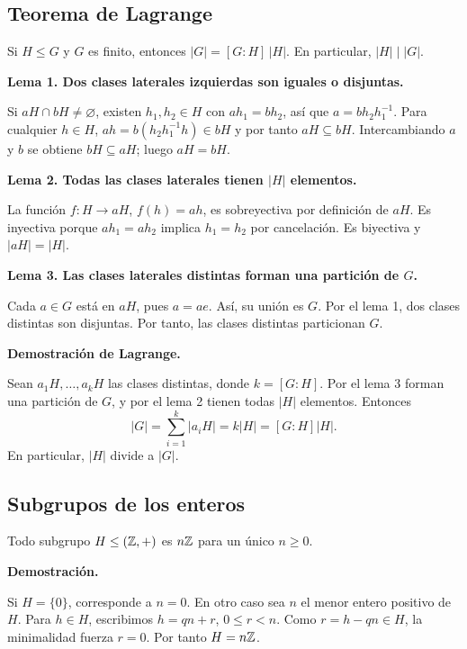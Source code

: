 \documentclass[11pt,a4paper]{article}
\begin{document}
\subsection{Teorema de Lagrange}
\begin{resultado}
Si $H\le G$ y $G$ es finito, entonces $|G|=[G:H]\,|H|$. En particular, $|H|\mid |G|$.
\end{resultado}
\textbf{Lema 1. Dos clases laterales izquierdas son iguales o disjuntas.}
\begin{demostracion}
Si $aH\cap bH\ne\varnothing$, existen $h_1,h_2\in H$ con $ah_1=bh_2$, así que $a=bh_2h_1^{-1}$. Para cualquier $h\in H$, $ah=b(h_2h_1^{-1}h)\in bH$ y por tanto $aH\subseteq bH$. Intercambiando $a$ y $b$ se obtiene $bH\subseteq aH$; luego $aH=bH$.
\end{demostracion}
\textbf{Lema 2. Todas las clases laterales tienen $|H|$ elementos.}
\begin{demostracion}
La función $f:H\to aH$, $f(h)=ah$, es sobreyectiva por definición de $aH$. Es inyectiva porque $ah_1=ah_2$ implica $h_1=h_2$ por cancelación. Es biyectiva y $|aH|=|H|$.
\end{demostracion}
\textbf{Lema 3. Las clases laterales distintas forman una partición de $G$.}
\begin{demostracion}
Cada $a\in G$ está en $aH$, pues $a=ae$. Así, su unión es $G$. Por el lema 1, dos clases distintas son disjuntas. Por tanto, las clases distintas particionan $G$.
\end{demostracion}
\textbf{Demostración de Lagrange.}
\begin{demostracion}
Sean $a_1H,\dots,a_kH$ las clases distintas, donde $k=[G:H]$. Por el lema 3 forman una partición de $G$, y por el lema 2 tienen todas $|H|$ elementos. Entonces
\[|G|=\sum_{i=1}^{k}|a_iH|=k|H|=[G:H]|H|.\]
En particular, $|H|$ divide a $|G|$.
\end{demostracion}


\subsection{Subgrupos de los enteros}
\begin{resultado}
Todo subgrupo $H\le(\mathbb{Z},+)$ es $n\mathbb{Z}$ para un único $n\ge0$.
\end{resultado}
\textbf{Demostración.}
\begin{demostracion}
Si $H=\{0\}$, corresponde a $n=0$. En otro caso sea $n$ el menor entero positivo de $H$. Para $h\in H$, escribimos $h=qn+r$, $0\le r<n$. Como $r=h-qn\in H$, la minimalidad fuerza $r=0$. Por tanto $H=n\mathbb{Z}$.
\end{demostracion}
\end{document}
